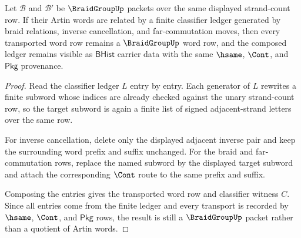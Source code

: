 \begin{theorem}
\label{thm:braidgroup-artin-ledger-stability}
Let $\mathcal{B}$ and $\mathcal{B}'$ be $\BraidGroupUp$ packets over the same displayed strand-count row. If their Artin words are related by a finite classifier ledger generated by braid relations, inverse cancellation, and far-commutation moves, then every transported word row remains a $\BraidGroupUp$ word row, and the composed ledger remains visible as $\mathsf{BHist}$ carrier data with the same $\hsame$, $\Cont$, and $\mathsf{Pkg}$ provenance.
\end{theorem}
\begin{proof}
Read the classifier ledger $L$ entry by entry. Each generator of $L$ rewrites a finite subword whose indices are already checked against the unary strand-count row, so the target subword is again a finite list of signed adjacent-strand letters over the same row.

For inverse cancellation, delete only the displayed adjacent inverse pair and keep the surrounding word prefix and suffix unchanged. For the braid and far-commutation rows, replace the named subword by the displayed target subword and attach the corresponding $\Cont$ route to the same prefix and suffix.

Composing the entries gives the transported word row and classifier witness $C$. Since all entries come from the finite ledger and every transport is recorded by $\hsame$, $\Cont$, and $\mathsf{Pkg}$ rows, the result is still a $\BraidGroupUp$ packet rather than a quotient of Artin words.
\end{proof}

